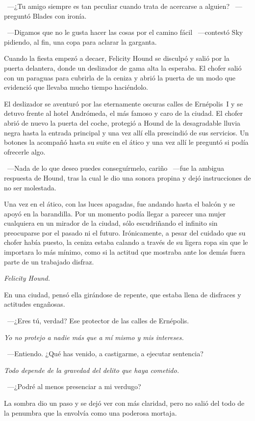 ~---¿Tu amigo siempre es tan peculiar cuando trata de acercarse a alguien? ~---preguntó Blades con ironía.

~---Digamos que no le gusta hacer las cosas por el camino fácil ~---contestó Sky pidiendo, al fin, una copa para aclarar la garganta.

\parbreak
Cuando la fiesta empezó a decaer, Felicity Hound se disculpó y salió por la puerta delantera, donde un deslizador de gama alta la esperaba. El chofer salió con un paraguas para cubrirla de la ceniza y abrió la puerta de un modo que evidenció que llevaba mucho tiempo haciéndolo.

El deslizador se aventuró por las eternamente oscuras calles de Ernépolis~I y se detuvo frente al hotel Andrómeda, el más famoso y caro de la ciudad. El chofer abrió de nuevo la puerta del coche, protegió a Hound de la desagradable lluvia negra hasta la entrada principal y una vez allí ella prescindió de sus servicios.
Un botones la acompañó hasta su suite en el ático y una vez allí le preguntó si podía ofrecerle algo.

~---Nada de lo que deseo puedes conseguírmelo, cariño ~---fue la ambigua respuesta de Hound, tras la cual le dio una sonora propina y dejó instrucciones de no ser molestada.

Una vez en el ático, con las luces apagadas, fue andando hasta el balcón y se apoyó en la barandilla. Por un momento podía llegar a parecer una mujer cualquiera en un mirador de la ciudad, sólo escudriñando el infinito sin preocuparse por el pasado ni el futuro. Irónicamente, a pesar del cuidado que su chofer había puesto, la ceniza estaba calando a través de su ligera ropa sin que le importara lo más mínimo, como si la actitud que mostraba ante los demás fuera parte de un trabajado disfraz.

\emph{Felicity Hound.}

En una ciudad, pensó ella girándose de repente, que estaba llena de disfraces y actitudes engañosas.

~---¿Eres tú, verdad? Ese protector de las calles de Ernépolis.

\emph{Yo no protejo a nadie más que a mí mismo y mis intereses.}

~---Entiendo. ¿Qué has venido, a castigarme, a ejecutar sentencia?

\emph{Todo depende de la gravedad del delito que haya cometido.}

~---¿Podré al menos presenciar a mi verdugo?

La sombra dio un paso y se dejó ver con más claridad, pero no salió del todo de la penumbra que la envolvía como una poderosa mortaja.

